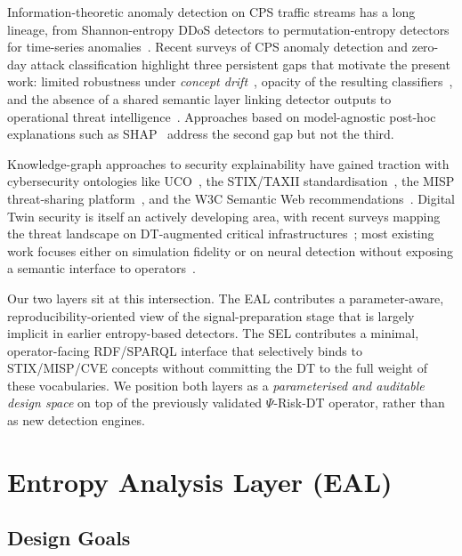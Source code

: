 \documentclass[futureinternet,article,submit,pdftex,moreauthors]{Definitions/mdpi}
\newcommand{\psiop}{\ensuremath{\Psi}}
\begin{document}
Information-theoretic anomaly detection on CPS traffic streams has a
long lineage, from Shannon-entropy DDoS detectors to permutation-entropy
detectors for time-series anomalies~\cite{bandt2002,pincus1991,kitsune2018}.
Recent surveys of CPS anomaly detection and zero-day attack
classification highlight three persistent gaps that motivate the
present work: limited robustness under \emph{concept
drift}~\cite{gama2014}, opacity of the resulting
classifiers~\cite{adadi2018,capuano2022}, and the absence of a
shared semantic layer linking detector outputs to operational threat
intelligence~\cite{mlcps2024,zeroday2022,cicids2017}. Approaches based
on model-agnostic post-hoc explanations such as
SHAP~\cite{lundberg2017} address the second gap but not the third.

Knowledge-graph approaches to security explainability have gained
traction with cybersecurity ontologies like
UCO~\cite{uco2016,ckgsurvey2023}, the STIX/TAXII
standardisation~\cite{stix21}, the MISP threat-sharing
platform~\cite{misp}, and the W3C Semantic Web
recommendations~\cite{owl2,sparql11}. Digital Twin security is itself
an actively developing area, with recent surveys mapping the threat
landscape on DT-augmented critical
infrastructures~\cite{alcaraz2022,dtsec2023}; most existing work
focuses either on simulation fidelity or on neural detection without
exposing a semantic interface to operators~\cite{hdir2,paper3}.

Our two layers sit at this intersection. The EAL contributes a
parameter-aware, reproducibility-oriented view of the signal-preparation
stage that is largely implicit in earlier entropy-based detectors. The
SEL contributes a minimal, operator-facing RDF/SPARQL interface that
selectively binds to STIX/MISP/CVE concepts without committing the DT to
the full weight of these vocabularies. We position both layers as a
\emph{parameterised and auditable design space} on top of the previously
validated $\psiop$-Risk-DT operator, rather than as new detection
engines.

\section{Entropy Analysis Layer (EAL)}
\label{sec:eal}

\subsection{Design Goals}
\end{document}
